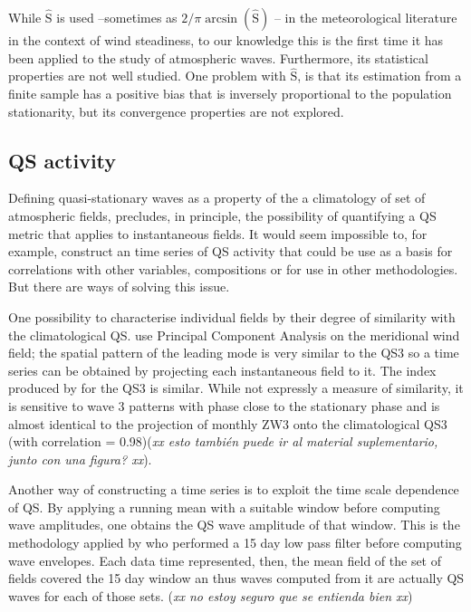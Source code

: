 \documentclass[draft,linenumbers]{agujournal2018}
\begin{document}
While \(\hat{\mathrm{S}}\) is used --sometimes as
\(2/\pi\arcsin \left (\hat{\mathrm{S}} \right )\) \citep{Singer1967}--
in the meteorological literature in the context of wind steadiness, to
our knowledge this is the first time it has been applied to the study of
atmospheric waves. Furthermore, its statistical properties are not well
studied. One problem with \(\hat{\mathrm{S}}\), is that its estimation
from a finite sample has a positive bias that is inversely proportional
to the population stationarity, but its convergence properties are not
explored.

\subsection{QS activity}

Defining quasi-stationary waves as a property of the a climatology of
set of atmospheric fields, precludes, in principle, the possibility of
quantifying a QS metric that applies to instantaneous fields. It would
seem impossible to, for example, construct an time series of QS activity
that could be use as a basis for correlations with other variables,
compositions or for use in other methodologies. But there are ways of
solving this issue.

One possibility to characterise individual fields by their degree of
similarity with the climatological QS. \citet{Yuan2008} use Principal
Component Analysis on the meridional wind field; the spatial pattern of
the leading mode is very similar to the QS3 so a time series can be
obtained by projecting each instantaneous field to it. The index
produced by \citet{Raphael2004} for the QS3 is similar. While not
expressly a measure of similarity, it is sensitive to wave 3 patterns
with phase close to the stationary phase and is almost identical to the
projection of monthly ZW3 onto the climatological QS3 (with correlation
= 0.98)(\emph{xx esto también puede ir al material suplementario, junto
con una figura? xx}).

Another way of constructing a time series is to exploit the time scale
dependence of QS. By applying a running mean with a suitable window
before computing wave amplitudes, one obtains the QS wave amplitude of
that window. This is the methodology applied by \citet{Wolf2018} who
performed a 15 day low pass filter before computing wave envelopes. Each
data time represented, then, the mean field of the set of fields covered
the 15 day window an thus waves computed from it are actually QS waves
for each of those sets. (\emph{xx no estoy seguro que se entienda bien
xx})
\end{document}

